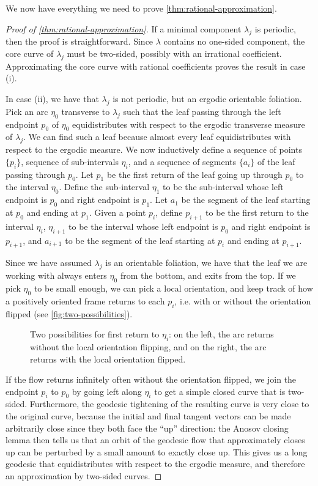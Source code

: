 We now have everything we need to prove \autoref{thm:rational-approximation}.
\begin{proof}[Proof of \autoref{thm:rational-approximation}]
  If a minimal component $\lambda_j$ is periodic, then the proof is straightforward.
  Since $\lambda$ contains no one-sided component, the core curve of $\lambda_j$ must be two-sided, possibly with an irrational coefficient.
  Approximating the core curve with rational coefficients proves the result in case (i).

  In case (ii), we have that $\lambda_j$ is not periodic, but an ergodic orientable foliation.
  Pick an arc $\eta_0$ transverse to $\lambda_j$ such that the leaf passing through the left endpoint $p_0$ of $\eta_0$ equidistributes with respect to the ergodic transverse measure of $\lambda_j$.
  We can find such a leaf because almost every leaf equidistributes with respect to the ergodic measure.
  We now inductively define a sequence of points $\{p_i\}$, sequence of sub-intervals $\eta_i$, and a sequence of segments $\{a_i\}$ of the leaf passing through $p_0$.
  Let $p_1$ be the first return of the leaf going up through $p_0$ to the interval $\eta_0$.
  Define the sub-interval $\eta_1$ to be the sub-interval whose left endpoint is $p_0$ and right endpoint is $p_1$.
  Let $a_1$ be the segment of the leaf starting at $p_0$ and ending at $p_1$.
  Given a point $p_i$, define $p_{i+1}$ to be the first return to the interval $\eta_{i}$, $\eta_{i+1}$ to be the interval whose left endpoint is $p_0$ and right endpoint is $p_{i+1}$, and $a_{i+1}$ to be the segment of the leaf starting at $p_i$ and ending at $p_{i+1}$.

  Since we have assumed $\lambda_j$ is an orientable foliation, we have that the leaf we are working with always enters $\eta_0$ from the bottom, and exits from the top.
  If we pick $\eta_0$ to be small enough, we can pick a local orientation, and keep track of how a positively oriented frame returns to each $p_i$, i.e. with or without the orientation flipped (see \autoref{fig:two-possibilities}).
  \begin{figure}[h]
    \centering
    \caption{Two possibilities for first return to $\eta_i$: on the left, the arc returns without the local orientation flipping, and on the right, the arc returns with the local orientation flipped.}
    \label{fig:two-possibilities}
  \end{figure}
  If the flow returns infinitely often without the orientation flipped, we join the endpoint $p_i$ to $p_0$ by going left along $\eta_i$ to get a simple closed curve that is two-sided.
  Furthermore, the geodesic tightening of the resulting curve is very close to the original curve, because the initial and final tangent vectors can be made arbitrarily close since they both face the ``up'' direction: the Anosov closing lemma then tells us that an orbit of the geodesic flow that approximately closes up can be perturbed by a small amount to exactly close up.
  This gives us a long geodesic that equidistributes with respect to the ergodic measure, and therefore an approximation by two-sided curves.


\end{proof}
